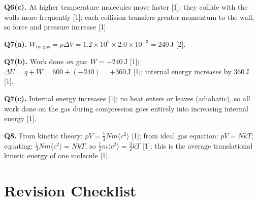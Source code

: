 \begin{markbox}
\textbf{Q6(c).}
At higher temperature molecules move faster [1]; they collide with the walls more
frequently [1]; each collision transfers greater momentum to the wall, so force and
pressure increase [1].

\medskip
\textbf{Q7(a).}
$W_{\text{by gas}} = p\Delta V = 1.2\times10^5 \times 2.0\times10^{-3}
= 240\,\mathrm{J}$ [2].

\textbf{Q7(b).}
Work done \emph{on} gas: $W = -240\,\mathrm{J}$ [1];\quad
$\Delta U = q + W = 600 + (-240) = +360\,\mathrm{J}$ [1];\quad
internal energy increases by $360\,\mathrm{J}$ [1].

\textbf{Q7(c).}
Internal energy increases [1]; no heat enters or leaves (adiabatic), so all work done
on the gas during compression goes entirely into increasing internal energy [1].

\medskip
\textbf{Q8.}
From kinetic theory: $pV = \tfrac{1}{3}Nm\langle c^2\rangle$ [1];
from ideal gas equation: $pV = NkT$;
equating: $\tfrac{1}{3}Nm\langle c^2\rangle = NkT$,
so $\tfrac{1}{2}m\langle c^2\rangle = \tfrac{3}{2}kT$ [1];
this is the average translational kinetic energy of one molecule [1].
\end{markbox}

\newpage
\section{Revision Checklist}

